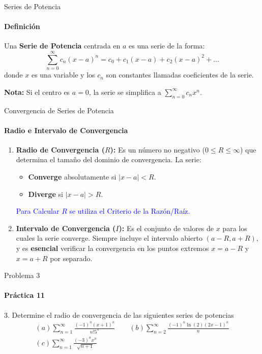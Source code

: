 \documentclass{plantillaPPT}
\begin{document}
\begin{frame}{Series de Potencia}
\framesubtitle{Definición}

\begin{definicion}
    Una \textbf{Serie de Potencia} centrada en $a$ es una serie de la forma:
    \[
    \sum_{n=0}^{\infty} c_n (x-a)^n = c_0 + c_1(x-a) + c_2(x-a)^2 + \dots
    \]
    donde $x$ es una variable y los $c_n$ son constantes llamadas coeficientes de la serie.
\end{definicion}

\textbf{Nota:} Si el centro es $a=0$, la serie se simplifica a $\sum_{n=0}^{\infty} c_n x^n$.
\end{frame}

\begin{frame}{Convergencia de Series de Potencia}
\framesubtitle{Radio e Intervalo de Convergencia}

\small %
\begin{enumerate}
    \item \textbf{Radio de Convergencia ($R$):} Es un número no negativo ($0 \le R \le \infty$) que determina el tamaño del dominio de convergencia. La serie:
    \begin{itemize}
        \item \textbf{Converge} absolutamente si $|x-a| < R$.
        \item \textbf{Diverge} si $|x-a| > R$.
    \end{itemize}
    \textcolor{blue}{Para Calcular $R$ se utiliza el Criterio de la Razón/Raíz.}
    \vspace{0.5cm}
    \item \textbf{Intervalo de Convergencia ($I$):} Es el conjunto de valores de $x$ para los cuales la serie converge. Siempre incluye el intervalo abierto $(a-R, a+R)$, y es \textbf{esencial} verificar la convergencia en los puntos extremos $x=a-R$ y $x=a+R$ por separado.
\end{enumerate}
\end{frame}

\begin{frame}{Problema 3}
\framesubtitle{Práctica 11}

3. Determine el radio de convergencia de las siguientes series de potencias
\begin{equation*}
\begin{gathered}
(a) \sum_{n=1}^\infty \frac{(-1)^n(x+1)^n}{n!5^n} \qquad (b) \sum_{n=2}^\infty \frac{(-1)^n\ln(2)(2x-1)^n}{n} \\[1cm]
(c) \sum_{n=1}^\infty \frac{(-3)^n x^n}{\sqrt{n+1}}
\end{gathered}
\end{equation*}

\end{frame}
\end{document}
